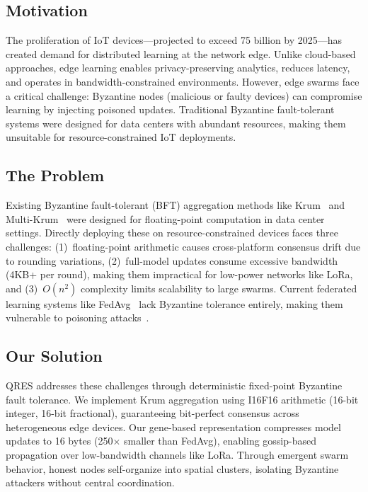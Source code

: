 \documentclass[conference,10pt]{IEEEtran}
\begin{document}
\subsection{Motivation}
The proliferation of IoT devices---projected to exceed 75 billion by 2025---has created demand for distributed learning at the network edge. Unlike cloud-based approaches, edge learning enables privacy-preserving analytics, reduces latency, and operates in bandwidth-constrained environments. However, edge swarms face a critical challenge: Byzantine nodes (malicious or faulty devices) can compromise learning by injecting poisoned updates. Traditional Byzantine fault-tolerant systems were designed for data centers with abundant resources, making them unsuitable for resource-constrained IoT deployments.

\subsection{The Problem}
Existing Byzantine fault-tolerant (BFT) aggregation methods like Krum~\cite{blanchard2017machine} and Multi-Krum~\cite{elmhamdi2018hidden} were designed for floating-point computation in data center settings. Directly deploying these on resource-constrained devices faces three challenges: (1)~floating-point arithmetic causes cross-platform consensus drift due to rounding variations, (2)~full-model updates consume excessive bandwidth (4KB+ per round), making them impractical for low-power networks like LoRa, and (3)~$O(n^2)$ complexity limits scalability to large swarms. Current federated learning systems like FedAvg~\cite{mcmahan2017communication} lack Byzantine tolerance entirely, making them vulnerable to poisoning attacks~\cite{bagdasaryan2020backdoor}.

\subsection{Our Solution}
QRES addresses these challenges through deterministic fixed-point Byzantine fault tolerance. We implement Krum aggregation using I16F16 arithmetic (16-bit integer, 16-bit fractional), guaranteeing bit-perfect consensus across heterogeneous edge devices. Our gene-based representation compresses model updates to 16 bytes (250$\times$ smaller than FedAvg), enabling gossip-based propagation over low-bandwidth channels like LoRa. Through emergent swarm behavior, honest nodes self-organize into spatial clusters, isolating Byzantine attackers without central coordination.
\end{document}
